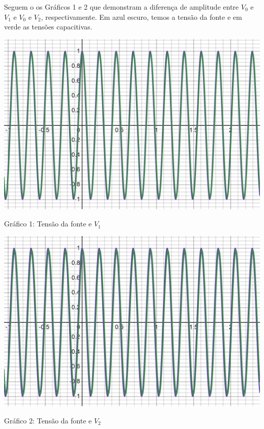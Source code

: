 \documentclass[a4 paper]{article}
\begin{document}
Seguem o os Gráficos 1 e 2 que demonstram a diferença de amplitude entre $V_0$ e $V_1$ e $V_0$ e $V_2$, respectivamente. Em azul escuro, temos a tensão da fonte e em verde as tensões capacitivas.

\begin{table}[h]
\centering
\includegraphics[scale=0.225]{rgadicoas/grafico1}
\end{table}

\begin{center}
Gráfico 1: Tensão da fonte e $V_1$
\end{center}


\begin{table}[h]
\centering
\includegraphics[scale=0.225]{rgadicoas/grafico5}
\end{table}

\begin{center}
Gráfico 2: Tensão da fonte e $V_2$
\end{center}
\end{document}
